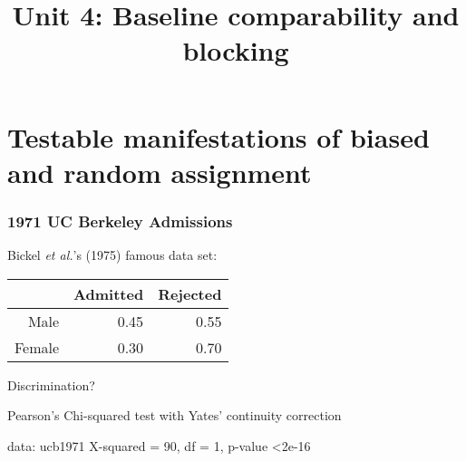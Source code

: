 

%

%





\title{Unit 4: Baseline comparability and blocking}









\section[tests of assignment]{Testable manifestations of biased and random assignment}

\begin{frame}[fragile]
  \frametitle{1971 UC Berkeley Admissions}

Bickel \textit{et al.}'s (1975)%
famous data set:\\[1ex]

\begin{tabular}{rrr}
  \hline
 & Admitted & Rejected \\ 
  \hline
Male & 0.45 & 0.55 \\ 
  Female & 0.30 & 0.70 \\ 
   \hline
\end{tabular}
\vspace{2ex}

Discrimination?\\[3ex]

\pause
\begin{Schunk}
\begin{Soutput}
	Pearson's Chi-squared test with Yates'
	continuity correction

data:  ucb1971
X-squared = 90, df = 1, p-value <2e-16
\end{Soutput}
\end{Schunk}
\end{frame}

